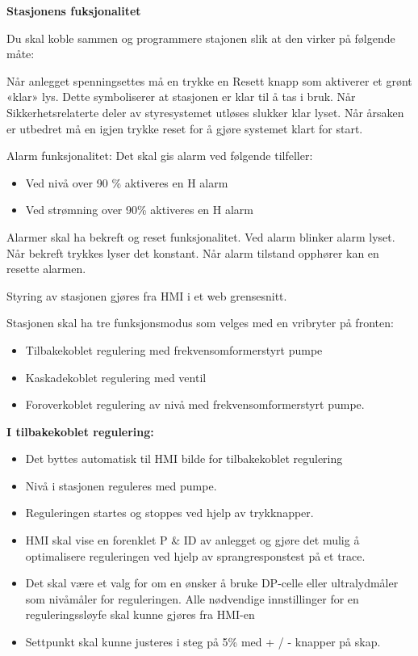 \textbf{Stasjonens fuksjonalitet}
\vskip 10pt 

Du skal koble sammen og programmere stajonen slik at den virker på følgende måte:

\vskip 5pt 

Når anlegget spenningsettes må en trykke en Resett knapp som aktiverer et grønt «klar» lys. Dette symboliserer at stasjonen er klar til å tas i bruk. Når Sikkerhetsrelaterte deler av styresystemet utløses slukker klar lyset. Når årsaken er utbedret må en igjen trykke reset for å gjøre systemet klart for start.  

\vskip 5pt 
Alarm funksjonalitet: 
\vskip 5pt 
Det skal gis alarm ved følgende tilfeller: 
\begin{itemize}[noitemsep]
\item Ved nivå over 90 \% aktiveres en H alarm
\item Ved strømning over 90\% aktiveres en H alarm 

\end{itemize}
\vskip 5pt 
Alarmer skal ha bekreft og reset funksjonalitet. Ved alarm blinker alarm lyset. Når bekreft trykkes lyser det konstant. Når alarm tilstand opphører kan en resette alarmen.  

\vskip 5pt 
Styring av stasjonen gjøres fra HMI i et web grensesnitt.

\vskip 5pt 
Stasjonen skal ha tre funksjonsmodus som velges med en vribryter på fronten:
\begin{itemize}[noitemsep]
	\item Tilbakekoblet regulering med frekvensomformerstyrt pumpe
	\item Kaskadekoblet regulering med ventil 
	\item Foroverkoblet regulering av nivå med frekvensomformerstyrt pumpe. 
\end{itemize}

\vskip 5pt 
\vskip 5pt 
\textbf{I tilbakekoblet regulering:} 
\begin{itemize}[noitemsep]
	\item Det byttes automatisk til HMI bilde for tilbakekoblet regulering 
	\item Nivå i stasjonen reguleres med pumpe.  
	\item Reguleringen startes og stoppes ved hjelp av trykknapper.   
	\item HMI skal vise en forenklet P \& ID av anlegget og gjøre det mulig å optimalisere reguleringen ved hjelp av sprangresponstest på et trace.  
	\item Det skal være et valg for om en ønsker å bruke DP-celle eller ultralydmåler som nivåmåler for reguleringen. Alle nødvendige innstillinger for en reguleringssløyfe skal kunne gjøres fra HMI-en 
	\item Settpunkt skal kunne justeres i steg på 5\% med + / - knapper på skap.  

\end{itemize}


